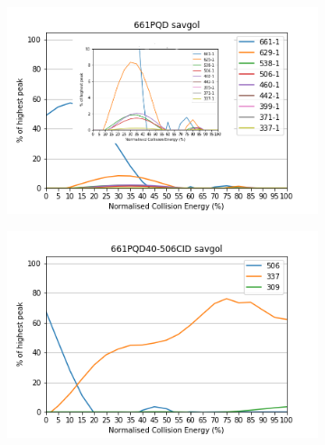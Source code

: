 \begin{figure}[!htbp]
  \begin{subfigure}[b]{0.5\textwidth}
    \includegraphics[width=\textwidth]{content/Anhang/ESIMS/RP_Bo-NCC-3/661PQD-661-1savgol_pic.png}
    \caption{}
  \end{subfigure}
  \hfill
  \begin{subfigure}[b]{0.5\textwidth}
    \includegraphics[width=\textwidth]{content/Anhang/ESIMS/RP_Bo-NCC-3/661PQD40-506CID-506savgol.png}
    \caption{}
  \end{subfigure}
  

\end{figure}
